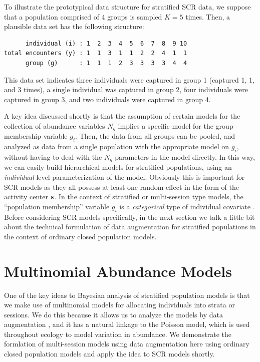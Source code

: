 To illustrate the prototypical data structure for stratified SCR data,
we suppose that a population comprised of 4 groups is sampled
$K=5$ times. Then, a plausible data set has the following structure:
\begin{verbatim}
      individual (i) : 1  2  3  4  5  6  7  8  9 10
total encounters (y) : 1  1  3  1  1  2  2  4  1  1
      group (g)      : 1  1  1  2  3  3  3  3  4  4
\end{verbatim}
This data set indicates three individuals were captured in
group 1 (captured 1, 1, and 3 times), a single individual was
captured in group 2, four individuals were captured in group
3, and two individuals were captured in group 4.

A key idea discussed shortly is that the assumption of certain models
for the collection of abundance variables $N_{g}$ implies a specific
model for the group membership variable $g_{i}$.  Then, the data from
all groups can be pooled, and analyzed as data from a single
population with the appropriate model on $g_{i}$, without having to
deal with the $N_{g}$ parameters in the model directly. In this way,
we can easily build hierarchical models for stratified populations,
using an {\it individual} level parameterization of the
model. Obviously this is important for SCR models as they all possess
at least one random effect in the form of the activity center ${\bf
  s}$.
In the context of stratified or multi-session type
models, the ``population membership'' variable $g_{i}$ is a {\it
  categorical} type of individual covariate \citep{huggins:1989,
  alho:1990, royle:2009}.  Before considering SCR models specifically,
in the next section we talk a little bit about the technical
formulation of data augmentation for stratified populations in the
context of ordinary closed population models.


\section{Multinomial Abundance Models}

One of the key ideas to Bayesian analysis of stratified population
models is that we make use of multinomial models for allocating
individuals into strata or sessions. We do this because it allows us
to analyze the models by data augmentation \citep{converse_royle:2012,
  royle_converse:2013}, and it has a natural linkage to the Poisson
model, which is used throughout ecology to model variation in
abundance. We demonstrate the formlation of multi-session models using
data augmentation here using ordinary closed population models and
apply the idea to SCR models shortly.

